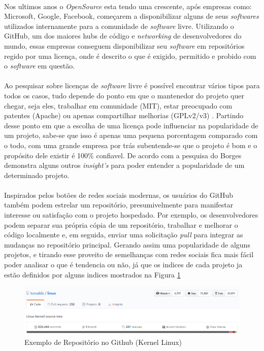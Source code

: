 \paragraph{}
Nos ultimos anos o \textit{OpenSource} esta tendo uma crescente, após empresas como: Microsoft, Google, Facebook, começarem a disponibilizar alguns de seus \textit{softwares} utilizados internamente para a comunidade de \textit{software} livre.
Utilizando o GitHub, um dos maiores hubs de código e \textit{networking} de desenvolvedores do mundo, essas empresas conseguem disponibilizar seu \textit{software} em repositórios regido por uma licença, onde é descrito o que é exigido, permitido e probido com o \textit{software} em questão.

\paragraph{}
Ao pesquisar sobre licenças de \textit{software} livre é possível encontrar vários tipos para todos os casos, tudo depende do ponto em que o mantenedor do projeto quer chegar, seja eles, trabalhar em comunidade (MIT), estar preocupado com patentes (Apache) ou apenas compartilhar melhorias (GPLv2/v3) \cite{choosealicense}.
Partindo desse ponto em que a escolha de uma licença pode influenciar na popularidade de um projeto, sabe-se que isso é apenas uma pequena porcentagem comparado com o todo, com uma grande empresa por trás subentende-se que o projeto é bom e o propósito dele existir é 100\% confiavel. De acordo com a pesquisa do Borges \cite{borges2016understanding} demonstra alguns outros \textit{insight's} para poder entender a popularidade de um determinado projeto.

\paragraph{}
Inspirados pelos botões de redes sociais modernas, os usuários do GitHub também podem estrelar um repositório, presumivelmente para manifestar interesse ou satisfação com o projeto hospedado\cite{gousios2014exploratory, gousios2015work}.
Por exemplo, os desenvolvedores podem separar sua própria cópia de um repositório, trabalhar e melhorar o código localmente e, em seguida, enviar uma solicitação \textit{pull} para integrar as mudanças no repositório principal\cite{borges2016understanding}. Gerando assim uma popularidade de alguns projetos, e tirando esse proveito de semelhanças com redes sociais fica mais fácil poder analisar o que é tendencia ou não, já que os indices de cada projeto ja estão definidos por alguns indices mostrados na Figura \ref{fig:github-linux}
\begin{figure}[h!]
    \centering
    \includegraphics[width=\linewidth]{assets/images/github-linux.PNG}
    \caption{Exemplo de Repositório no Github (Kernel Linux)}
    \label{fig:github-linux}
\end{figure}

\paragraph{}
